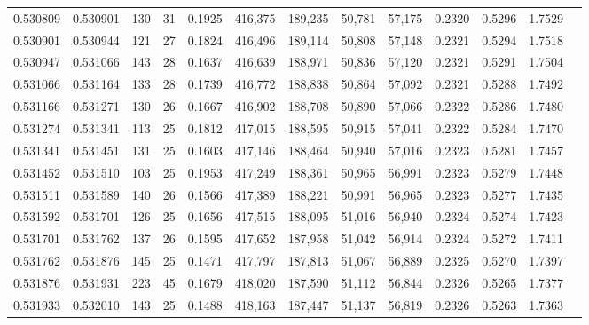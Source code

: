 \begin{tabular}{rrrrrrrrrrrrr}
0.530809 & 0.530901 & 130 &  31 &                                     0.1925 & 416,375 & 189,235 &  50,781 &  57,175 & 0.2320 & 0.5296 & 1.7529 \\
0.530901 & 0.530944 & 121 &  27 &                                     0.1824 & 416,496 & 189,114 &  50,808 &  57,148 & 0.2321 & 0.5294 & 1.7518 \\
0.530947 & 0.531066 & 143 &  28 &                                     0.1637 & 416,639 & 188,971 &  50,836 &  57,120 & 0.2321 & 0.5291 & 1.7504 \\
0.531066 & 0.531164 & 133 &  28 &                                     0.1739 & 416,772 & 188,838 &  50,864 &  57,092 & 0.2321 & 0.5288 & 1.7492 \\
0.531166 & 0.531271 & 130 &  26 &                                     0.1667 & 416,902 & 188,708 &  50,890 &  57,066 & 0.2322 & 0.5286 & 1.7480 \\
0.531274 & 0.531341 & 113 &  25 &                                     0.1812 & 417,015 & 188,595 &  50,915 &  57,041 & 0.2322 & 0.5284 & 1.7470 \\
0.531341 & 0.531451 & 131 &  25 &                                     0.1603 & 417,146 & 188,464 &  50,940 &  57,016 & 0.2323 & 0.5281 & 1.7457 \\
0.531452 & 0.531510 & 103 &  25 &                                     0.1953 & 417,249 & 188,361 &  50,965 &  56,991 & 0.2323 & 0.5279 & 1.7448 \\
0.531511 & 0.531589 & 140 &  26 &                                     0.1566 & 417,389 & 188,221 &  50,991 &  56,965 & 0.2323 & 0.5277 & 1.7435 \\
0.531592 & 0.531701 & 126 &  25 &                                     0.1656 & 417,515 & 188,095 &  51,016 &  56,940 & 0.2324 & 0.5274 & 1.7423 \\
0.531701 & 0.531762 & 137 &  26 &                                     0.1595 & 417,652 & 187,958 &  51,042 &  56,914 & 0.2324 & 0.5272 & 1.7411 \\
0.531762 & 0.531876 & 145 &  25 &                                     0.1471 & 417,797 & 187,813 &  51,067 &  56,889 & 0.2325 & 0.5270 & 1.7397 \\
0.531876 & 0.531931 & 223 &  45 &                                     0.1679 & 418,020 & 187,590 &  51,112 &  56,844 & 0.2326 & 0.5265 & 1.7377 \\
0.531933 & 0.532010 & 143 &  25 &                                     0.1488 & 418,163 & 187,447 &  51,137 &  56,819 & 0.2326 & 0.5263 & 1.7363 \\

\end{tabular}
